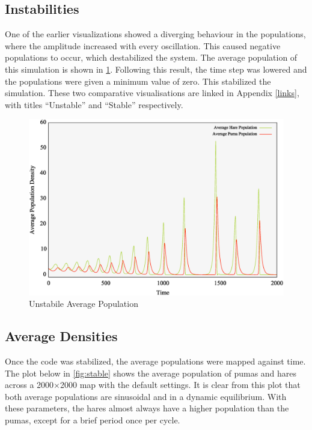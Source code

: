 \documentclass[a4paper,11pt]{article}
\begin{document}
\subsection{Instabilities}

One of the earlier visualizations showed a diverging behaviour in the populations, where the amplitude increased with every oscillation.  This caused negative populations to occur, which destabilized the system.  The average population of this simulation is shown in \ref{fig:unstable}.  Following this result, the time step was lowered and the populations were given a minimum value of zero.  This stabilized the simulation.  These two comparative visualisations are linked in Appendix \ref{links}, with titles ``Unstable'' and ``Stable'' respectively. 

\begin{figure}[h]
\includegraphics[width=\textwidth]{unstable.eps}
\caption{Unstabile Average Population}
\label{fig:unstable}
\end{figure}
 

\subsection{Average Densities} 
Once the code was stabilized, the average populations were mapped against time.  The plot below in \ref{fig:stable} shows the average population of pumas and hares across a 2000$\times$2000 map with the default settings.  It is clear from this plot that both average populations are sinusoidal and in a dynamic equilibrium.  With these parameters, the hares almost always have a higher population than the pumas, except for a brief period once per cycle.  
 
\end{document}
